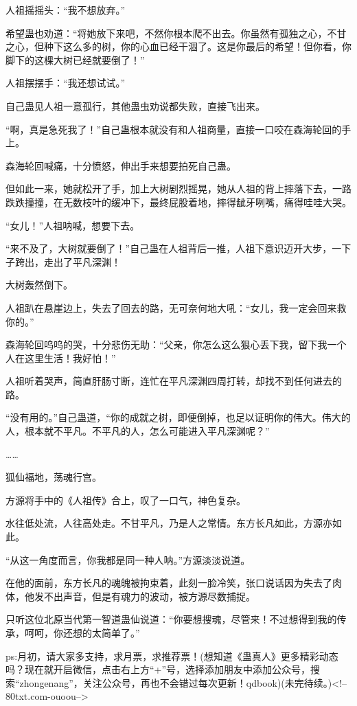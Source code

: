 \begin{this_body}
人祖摇摇头：“我不想放弃。”

希望蛊也劝道：“将她放下来吧，不然你根本爬不出去。你虽然有孤独之心，不甘之心，但种下这么多的树，你的心血已经干涸了。这是你最后的希望！但你看，你脚下的这棵大树已经就要倒了！”

人祖摆摆手：“我还想试试。”

自己蛊见人祖一意孤行，其他蛊虫劝说都失败，直接飞出来。

“啊，真是急死我了！”自己蛊根本就没有和人祖商量，直接一口咬在森海轮回的手上。

森海轮回喊痛，十分愤怒，伸出手来想要拍死自己蛊。

但如此一来，她就松开了手，加上大树剧烈摇晃，她从人祖的背上摔落下去，一路跌跌撞撞，在无数枝叶的缓冲下，最终屁股着地，摔得龇牙咧嘴，痛得哇哇大哭。

“女儿！”人祖呐喊，想要下去。

“来不及了，大树就要倒了！”自己蛊在人祖背后一推，人祖下意识迈开大步，一下子跨出，走出了平凡深渊！

大树轰然倒下。

人祖趴在悬崖边上，失去了回去的路，无可奈何地大吼：“女儿，我一定会回来救你的。”

森海轮回呜呜的哭，十分悲伤无助：“父亲，你怎么这么狠心丢下我，留下我一个人在这里生活！我好怕！”

人祖听着哭声，简直肝肠寸断，连忙在平凡深渊四周打转，却找不到任何进去的路。

“没有用的。”自己蛊道，“你的成就之树，即便倒掉，也足以证明你的伟大。伟大的人，根本就不平凡。不平凡的人，怎么可能进入平凡深渊呢？”

……

狐仙福地，荡魂行宫。

方源将手中的《人祖传》合上，叹了一口气，神色复杂。

水往低处流，人往高处走。不甘平凡，乃是人之常情。东方长凡如此，方源亦如此。

“从这一角度而言，你我都是同一种人呐。”方源淡淡说道。

在他的面前，东方长凡的魂魄被拘束着，此刻一脸冷笑，张口说话因为失去了肉体，他发不出声音，但是有魂力的波动，被方源尽数捕捉。

只听这位北原当代第一智道蛊仙说道：“你要想搜魂，尽管来！不过想得到我的传承，呵呵，你还想的太简单了。”

ps:月初，请大家多支持，求月票，求推荐票！(想知道《蛊真人》更多精彩动态吗？现在就开启微信，点击右上方“+”号，选择添加朋友中添加公众号，搜索“zhongenang”，关注公众号，再也不会错过每次更新！qdbook)(未完待续。)<!--80txt.com-ouoou-->

\end{this_body}

